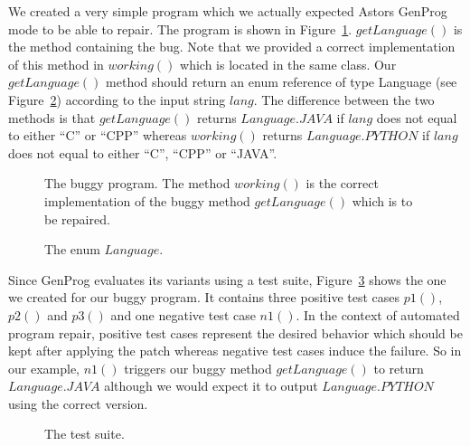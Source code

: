 \documentclass[pdftex,english,oribibl]{llncs}
\begin{document}
We created a very simple program which we actually expected Astors GenProg mode to be able to repair.
The program is shown in Figure~\ref{fig:testProgram}.
$getLanguage()$ is the method containing the bug.
Note that we provided a correct implementation of this method in $working()$ which is located in the same class.
Our $getLanguage()$ method should return an enum reference of type Language (see Figure~\ref{fig:enum}) according to the input string $lang$.
The difference between the two methods is that $getLanguage()$ returns $Language.JAVA$ if $lang$ does not equal to either ``C'' or ``CPP'' whereas $working()$ returns $Language.PYTHON$ if $lang$ does not equal to either ``C'', ``CPP'' or ``JAVA''.

\begin{figure}
	\begin{center}
		
	\end{center}
	\caption{The buggy program. The method $working()$ is the correct implementation of the buggy method $getLanguage()$ which is to be repaired.}
	\label{fig:testProgram}
\end{figure}

\begin{figure}
	\begin{center}
		
	\end{center}
	\caption{The enum $Language$.}
	\label{fig:enum}
\end{figure}

Since GenProg evaluates its variants using a test suite, Figure~\ref{fig:testsuite} shows the one we created for our buggy program. It contains three positive test cases $p1()$, $p2()$ and $p3()$ and one negative test case $n1()$. 
In the context of automated program repair, positive test cases represent the desired behavior which should be kept after applying the patch whereas negative test cases induce the failure.
So in our example, $n1()$ triggers our buggy method $getLanguage()$ to return $Language.JAVA$ although we would expect it to output $Language.PYTHON$ using the correct version.

\begin{figure}
\begin{center}

\end{center}
\caption{The test suite.}
\label{fig:testsuite}
\end{figure}
\end{document}
